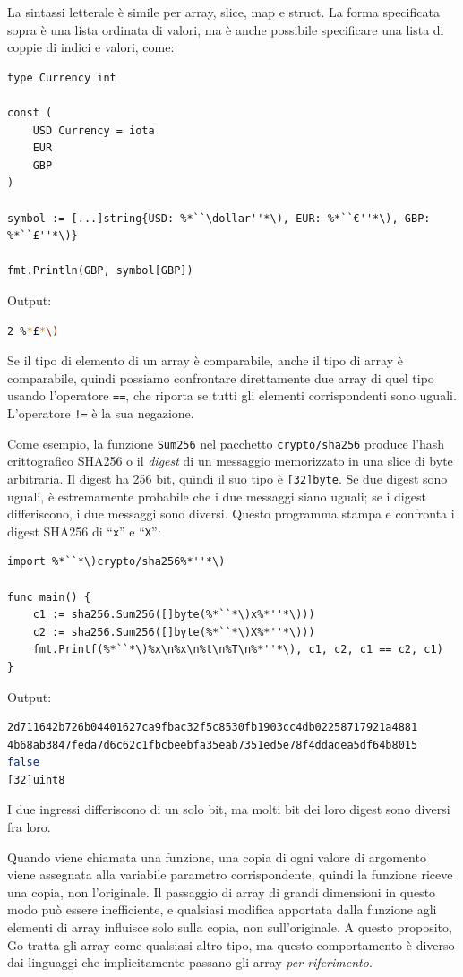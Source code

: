 La sintassi letterale è simile per array, slice, map e struct.
La forma specificata sopra è una lista ordinata di valori, ma è anche possibile specificare una lista di coppie di indici e valori, come:
\begin{lstlisting}[frame=single, label={lst:lstlisting3-1.7}]
type Currency int

const (
    USD Currency = iota
    EUR
    GBP
)

symbol := [...]string{USD: %*``\dollar''*\), EUR: %*``€''*\), GBP: %*``£''*\)}

fmt.Println(GBP, symbol[GBP])
\end{lstlisting}
Output:
\begin{lstlisting}[language=bash, frame=L, label={lst:lstlisting3-1.8}]
2 %*£*\)
\end{lstlisting}
Se il tipo di elemento di un array è comparabile, anche il tipo di array è comparabile, quindi possiamo confrontare direttamente due array di quel tipo usando l'operatore \verb|==|, che riporta se tutti gli elementi corrispondenti sono uguali.
L'operatore \verb|!=| è la sua negazione.

Come esempio, la funzione \verb|Sum256| nel pacchetto \verb|crypto/sha256| produce l'hash crittografico SHA256 o il \textit{digest} di un messaggio memorizzato in una slice di byte arbitraria.
Il digest ha 256 bit, quindi il suo tipo è \verb|[32]byte|.
Se due digest sono uguali, è estremamente probabile che i due messaggi siano uguali;
se i digest differiscono, i due messaggi sono diversi.
Questo programma stampa e confronta i digest SHA256 di ``\verb|x|'' e ``\verb|X|'':
\begin{lstlisting}[frame=single, label={lst:lstlisting3-1.9}]
import %*``*\)crypto/sha256%*''*\)

func main() {
    c1 := sha256.Sum256([]byte(%*``*\)x%*''*\)))
    c2 := sha256.Sum256([]byte(%*``*\)X%*''*\)))
    fmt.Printf(%*``*\)%x\n%x\n%t\n%T\n%*''*\), c1, c2, c1 == c2, c1)
}
\end{lstlisting}
Output:
\begin{lstlisting}[language=bash, frame=L, label={lst:lstlisting3-1.10}]
2d711642b726b04401627ca9fbac32f5c8530fb1903cc4db02258717921a4881
4b68ab3847feda7d6c62c1fbcbeebfa35eab7351ed5e78f4ddadea5df64b8015
false
[32]uint8
\end{lstlisting}
I due ingressi differiscono di un solo bit, ma molti bit dei loro digest sono diversi fra loro.

Quando viene chiamata una funzione, una copia di ogni valore di argomento viene assegnata alla variabile parametro corrispondente, quindi la funzione riceve una copia, non l'originale.
Il passaggio di array di grandi dimensioni in questo modo può essere inefficiente, e qualsiasi modifica apportata dalla funzione agli elementi di array influisce solo sulla copia, non sull'originale.
A questo proposito, Go tratta gli array come qualsiasi altro tipo, ma questo comportamento è diverso dai linguaggi che implicitamente passano gli array \textit{per riferimento}.

